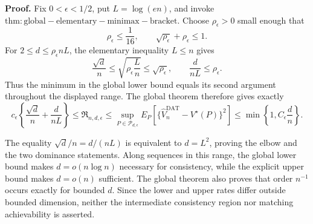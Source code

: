\textbf{Proof.}
Fix \(0<\epsilon<1/2\), put \(L=\log(en)\), and invoke \(\mathrm{thm:global-elementary-minimax-bracket}\).  Choose \(\rho_\epsilon>0\) small enough that
\[
 \rho_\epsilon\leq\frac1{16},
 \qquad
 \sqrt{\rho_\epsilon}+\rho_\epsilon\leq1.
\]
For \(2\leq d\leq\rho_\epsilon nL\), the elementary inequality \(L\leq n\) gives
\[
 \frac{\sqrt d}{n}
 \leq\sqrt{\rho_\epsilon\frac Ln}
 \leq\sqrt{\rho_\epsilon},
 \qquad
 \frac d{nL}\leq\rho_\epsilon.
\]
Thus the minimum in the global lower bound equals its second argument throughout the displayed range.  The global theorem therefore gives exactly
\[
 c_\epsilon\left\{\frac{\sqrt d}{n}+\frac d{nL}\right\}
 \leq\mathfrak R_{n,d,\epsilon}
 \leq\sup_{P\in\mathcal P_{d,\epsilon}}
 E_P\!\left[
  \{\widehat V_n^{\mathrm{DAT}}-V^\star(P)\}^2
 \right]
 \leq\min\!\left\{1,C_\epsilon\frac dn\right\}.
\]

The equality \(\sqrt d/n=d/(nL)\) is equivalent to \(d=L^2\), proving the elbow and the two dominance statements.  Along sequences in this range, the global lower bound makes \(d=o(n\log n)\) necessary for consistency, while the explicit upper bound makes \(d=o(n)\) sufficient.  The global theorem also proves that order \(n^{-1}\) occurs exactly for bounded \(d\).  Since the lower and upper rates differ outside bounded dimension, neither the intermediate consistency region nor matching achievability is asserted.